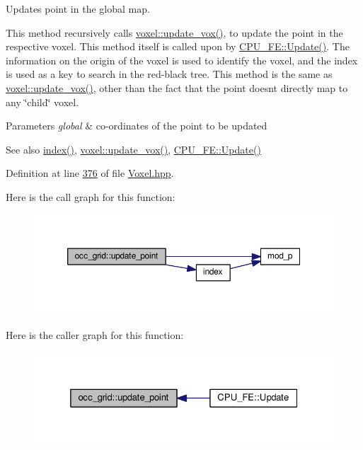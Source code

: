 Updates point in the global map. 

This method recursively calls \hyperlink{classvoxel_a97737aec7c381e72d929d2f084952683}{voxel\+::update\+\_\+vox()}, to update the point in the respective voxel. This method itself is called upon by \hyperlink{classCPU__FE_aae7cb60a405b294a680a929ecff5c2ae}{C\+P\+U\+\_\+\+F\+E\+::\+Update()}. The information on the origin of the voxel is used to identify the voxel, and the index is used as a key to search in the red-\/black tree. This method is the same as \hyperlink{classvoxel_a97737aec7c381e72d929d2f084952683}{voxel\+::update\+\_\+vox()}, other than the fact that the point doesn\textquotesingle{}t directly map to any \char`\"{}child\char`\"{} voxel. 
\begin{DoxyParams}{Parameters}
{\em global} & co-\/ordinates of the point to be updated \\
\hline
\end{DoxyParams}
\begin{DoxySeeAlso}{See also}
\hyperlink{classocc__grid_a0fb045d82217675decfc9b9289ad35ea}{index()}, \hyperlink{classvoxel_a97737aec7c381e72d929d2f084952683}{voxel\+::update\+\_\+vox()}, \hyperlink{classCPU__FE_aae7cb60a405b294a680a929ecff5c2ae}{C\+P\+U\+\_\+\+F\+E\+::\+Update()} 
\end{DoxySeeAlso}


Definition at line \hyperlink{Voxel_8hpp_source_l00376}{376} of file \hyperlink{Voxel_8hpp_source}{Voxel.\+hpp}.



Here is the call graph for this function\+:\nopagebreak
\begin{figure}[H]
\begin{center}
\leavevmode
\includegraphics[width=350pt]{classocc__grid_aaf38d339d7d1b3226d9673f8d6102b2c_cgraph}
\end{center}
\end{figure}




Here is the caller graph for this function\+:\nopagebreak
\begin{figure}[H]
\begin{center}
\leavevmode
\includegraphics[width=325pt]{classocc__grid_aaf38d339d7d1b3226d9673f8d6102b2c_icgraph}
\end{center}
\end{figure}




